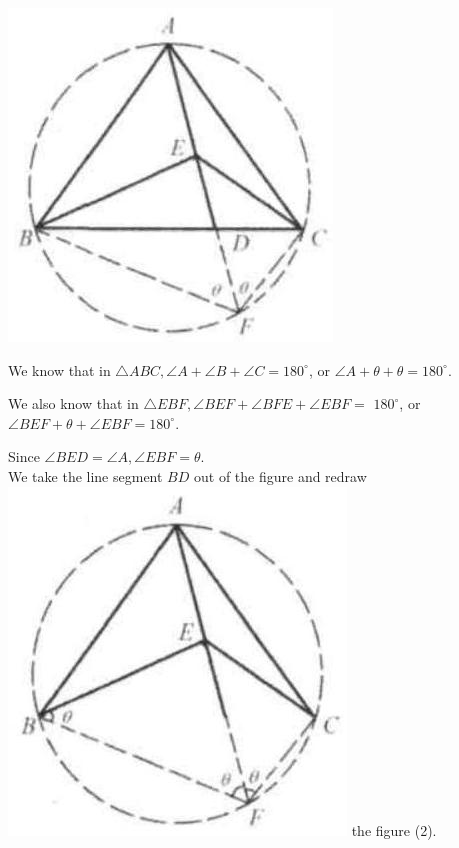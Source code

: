 \documentclass{article}
\begin{document}
\includegraphics[width=\textwidth]{images/202.jpg}

We know that in \(\triangle A B C, \angle A+\angle B+\angle C=180^{\circ}\), or \(\angle A+\theta+\theta=180^{\circ}\).

We also know that in \(\triangle E B F, \angle B E F+\angle B F E+\angle E B F=\) \(180^{\circ}\), or \(\angle B E F+\theta+\angle E B F=180^{\circ}\).

Since \(\angle B E D=\angle A, \angle E B F=\theta\).\\
We take the line segment \(B D\) out of the figure and redraw\\
\includegraphics[width=\textwidth]{images/202(1).jpg} the figure (2).
\end{document}

